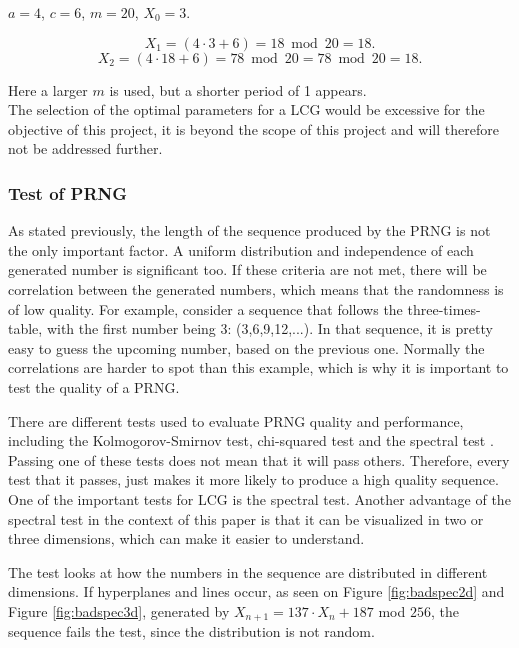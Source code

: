 \begin{center}
	$a=4$, $c=6$, $m=20$, $X_0=3.$
\end{center}

\begin{equation} X_1=(4 \cdot 3 +6)=18 \bmod 20=18.\end{equation}
\begin{equation}X_2=(4 \cdot 18+6)=78 \bmod 20=78 \bmod 20=18.\end{equation}

\noindent Here a larger $m$ is used, but a shorter period of 1 appears. 
\newline \\
The selection of the optimal parameters for a LCG would be excessive for the objective of this project, it is beyond the scope of this project and will therefore not be addressed further.

\subsubsection{Test of PRNG}
As stated previously, the length of the sequence produced by the PRNG is not the only important factor. A uniform distribution and independence of each generated number is significant too. If these criteria are not met, there will be correlation between the generated numbers, which means that the randomness is of low quality. For example, consider a sequence that follows the three-times-table, with the first number being 3: (3,6,9,12,...). In that sequence, it is pretty easy to guess the upcoming number, based on the previous one. Normally the correlations are harder to spot than this example, which is why it is important to test the quality of a PRNG.
\newline

\noindent There are different tests used to evaluate PRNG quality and performance, including the Kolmogorov-Smirnov test, chi-squared test and the spectral test \cite{knuth}. Passing one of these tests does not mean that it will pass others. Therefore, every test that it passes, just makes it more likely to produce a high quality sequence. One of the important tests for LCG is the spectral test. Another advantage of the spectral test in the context of this paper is that it can be visualized in two or three dimensions, which can make it easier to understand.
\newline

\noindent The test looks at how the numbers in the sequence are distributed in different dimensions. If hyperplanes and lines occur, as seen on Figure \ref{fig:badspec2d} and Figure \ref{fig:badspec3d}, generated by $X_{n+1}=137\cdot X_{n}+187$ mod $256$, the sequence fails the test, since the distribution is not random.
\newline

